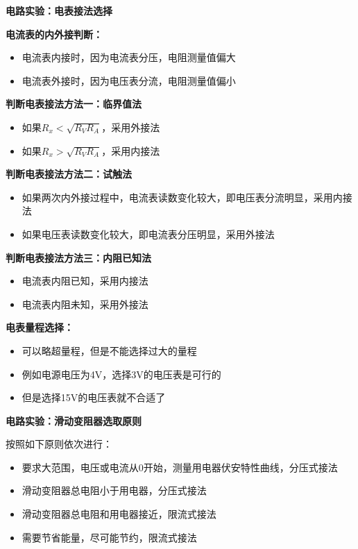\textbf{电路实验：电表接法选择}

\noindent\textbf{电流表的内外接判断：}
\begin{itemize}
  \item 电流表内接时，因为电流表分压，电阻测量值偏大
  \item 电流表外接时，因为电压表分流，电阻测量值偏小
\end{itemize}

\noindent\textbf{判断电表接法方法一：临界值法}
\begin{itemize}
  \item 如果$R_x<\sqrt{R_VR_A}$，采用外接法
  \item 如果$R_x>\sqrt{R_VR_A}$，采用内接法
\end{itemize}

\noindent\textbf{判断电表接法方法二：试触法}
\begin{itemize}
  \item 如果两次内外接过程中，电流表读数变化较大，即电压表分流明显，采用内接法
  \item 如果电压表读数变化较大，即电流表分压明显，采用外接法
\end{itemize}

\noindent\textbf{判断电表接法方法三：内阻已知法}
\begin{itemize}
  \item 电流表内阻已知，采用内接法
  \item 电流表内阻未知，采用外接法
\end{itemize}

\noindent\textbf{电表量程选择：}
\begin{itemize}
  \item 可以略超量程，但是不能选择过大的量程
  \item 例如电源电压为4V，选择3V的电压表是可行的
  \item 但是选择15V的电压表就不合适了
\end{itemize}

\textbf{电路实验：滑动变阻器选取原则}

按照如下原则依次进行：
\begin{itemize}
  \item 要求大范围，电压或电流从0开始，测量用电器伏安特性曲线，分压式接法
  \item 滑动变阻器总电阻小于用电器，分压式接法
  \item 滑动变阻器总电阻和用电器接近，限流式接法
  \item 需要节省能量，尽可能节约，限流式接法
\end{itemize}

